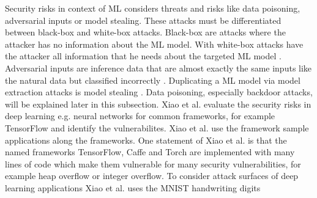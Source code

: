 Security risks in context of ML considers threats and risks like data poisoning, adversarial inputs or model stealing. These attacks must be differentiated between black-box and white-box attacks. Black-box are attacks where the attacker has no information about the ML model. With white-box attacks have the attacker all information that he needs about the targeted ML model \cite{tabassi2019taxonomy}. Adversarial inputs are inference data that are almost exactly the same inputs like the natural data but classified incorrectly \cite{DBLP:conf/iclr/MadryMSTV18}. Duplicating a ML model via model extraction attacks is model stealing \cite{DBLP:conf/acsac/Hu021}. Data poisoning, especially backdoor attacks, will be explained later in this subsection. Xiao et al.
\cite{DBLP:conf/sp/XiaoLZX18} evaluate the security risks in deep learning e.g. neural networks for common frameworks, for example TensorFlow and identify the vulnerabilites. Xiao et al. use the framework sample applications along the frameworks. One statement of Xiao et al. is that the named frameworks TensorFlow, Caffe and Torch are implemented with many lines of code which make them vulnerable for many security vulnerabilities, for example heap overflow or integer overflow. To consider attack surfaces of deep learning applications Xiao et al. uses the MNIST handwriting digits
